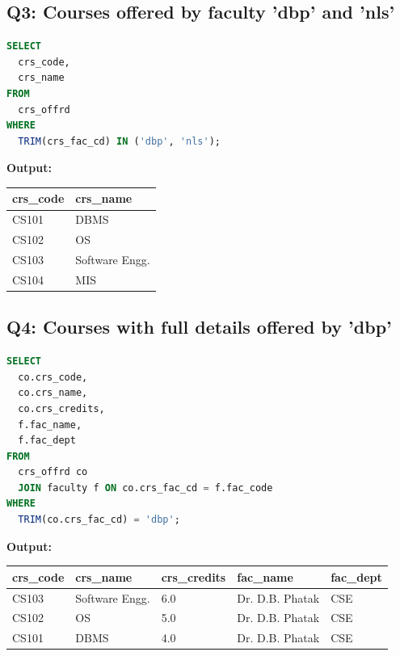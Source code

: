 \documentclass[11pt, a4paper]{article}
\begin{document}
\subsection*{Q3: Courses offered by faculty 'dbp' and 'nls'}
\begin{lstlisting}[language=SQL]
SELECT
  crs_code,
  crs_name
FROM
  crs_offrd
WHERE
  TRIM(crs_fac_cd) IN ('dbp', 'nls');
\end{lstlisting}
\vspace{0.3cm}
\textbf{Output:}\vspace{0.2cm}
\begin{center}
\begin{tabular}{|l|l|}
\hline
\textbf{crs\_code} & \textbf{crs\_name} \\ \hline
CS101 & DBMS                                \\ \hline
CS102 & OS                                  \\ \hline
CS103 & Software Engg.                      \\ \hline
CS104 & MIS                                 \\ \hline
\end{tabular}
\end{center}
\newpage
\subsection*{Q4: Courses with full details offered by 'dbp'}
\begin{lstlisting}[language=SQL]
SELECT
  co.crs_code,
  co.crs_name,
  co.crs_credits,
  f.fac_name,
  f.fac_dept
FROM
  crs_offrd co
  JOIN faculty f ON co.crs_fac_cd = f.fac_code
WHERE
  TRIM(co.crs_fac_cd) = 'dbp';
\end{lstlisting}
\vspace{0.3cm}
\textbf{Output:}\vspace{0.2cm}
\begin{center}
\begin{tabular}{|l|l|l|l|l|}
\hline
\textbf{crs\_code} & \textbf{crs\_name} & \textbf{crs\_credits} & \textbf{fac\_name} & \textbf{fac\_dept} \\ \hline
CS103 & Software Engg.                      & 6.0 & Dr. D.B. Phatak                & CSE \\ \hline
CS102 & OS                                  & 5.0 & Dr. D.B. Phatak                & CSE \\ \hline
CS101 & DBMS                                & 4.0 & Dr. D.B. Phatak                & CSE \\ \hline
\end{tabular}
\end{center}
\newpage
\end{document}
